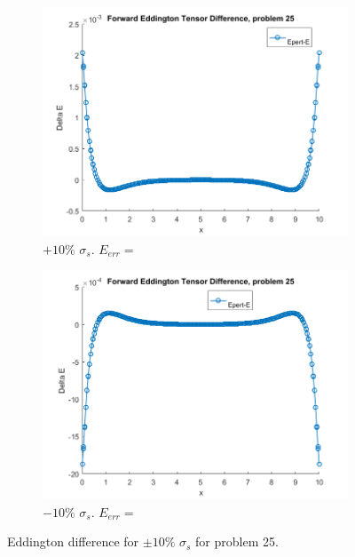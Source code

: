 \documentclass{article}
\begin{document}
\begin{figure}[H]
\centering
\begin{subfigure}{.5\textwidth}
  \centering
  \includegraphics[width=1\linewidth]{p25deltaEdss10.png}
  \caption{$+10\%$ $\sigma_s$. $E_{err}=$}
  \label{fig:sub1}
\end{subfigure}%
\begin{subfigure}{.5\textwidth}
  \centering
  \includegraphics[width=1\linewidth]{p25deltaEdss-10.png}
  \caption{$-10\%$ $\sigma_s$. $E_{err}=$}
  \label{fig:sub2}
\end{subfigure}
\caption{Eddington difference for $\pm10\%$ $\sigma_s$ for problem 25.}
\label{fig:test}
\end{figure}
\end{document}
